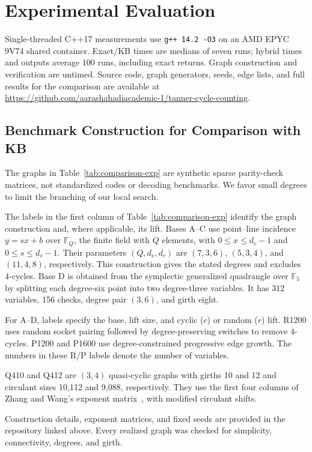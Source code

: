 \section{Experimental Evaluation}\label{sec:experiments}
Single-threaded C++17 measurements use \texttt{g++ 14.2 -O3} on an
AMD EPYC 9V74 shared container. Exact/KB times are medians of seven runs;
hybrid times and outputs average 100 runs, including exact returns.
Graph construction and verification are untimed. Source code, graph generators, seeds, edge lists, and full results
for the comparison are available at
\url{https://github.com/aarashahadiacademic-1/tanner-cycle-counting}.

\subsection{Benchmark Construction for Comparison with KB
\cite{karimi2013}}
The graphs in Table~\ref{tab:comparison-exp} are synthetic sparse parity-check
matrices, not standardized codes or decoding benchmarks.
We favor small degrees to limit the branching of our local search.

The labels in the first column of Table~\ref{tab:comparison-exp}
identify the graph construction and, where applicable, its lift.
Bases A--C use point--line incidence $y=sx+b$ over $\mathbb F_Q$,
the finite field with $Q$ elements, with
$0\le x \le d_c-1$ and $0\le s\le d_v-1$.
Their parameters $(Q,d_v,d_c)$ are $(7,3,6)$, $(5,3,4)$, and
$(11,4,8)$, respectively. This construction gives the stated degrees
and excludes $4$-cycles.
Base D is obtained from the symplectic generalized quadrangle over
$\mathbb F_5$ by splitting each degree-six point into two degree-three
variables. It has 312 variables, 156 checks, degree pair $(3,6)$,
and girth eight.

For A--D, labels specify the base, lift size, and cyclic ($c$) or
random ($r$) lift.
R1200 uses random socket pairing followed by
degree-preserving switches to remove $4$-cycles.
P1200 and P1600 use degree-constrained progressive edge growth.
The numbers in these R/P labels denote the number of variables.

Q410 and Q412 are $(3,4)$ quasi-cyclic graphs with girths 10 and 12
and circulant sizes 10,112 and 9,088, respectively.
They use the first four columns of Zhang and Wang's exponent
matrix~\cite{zhang2010}, with modified circulant shifts.

Construction details, exponent matrices, and fixed seeds are provided
in the repository linked above. Every realized graph was checked for
simplicity, connectivity, degrees, and girth.

